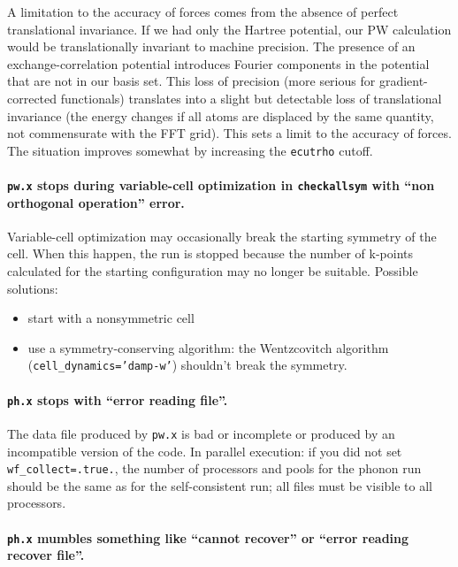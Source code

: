 \documentclass[12pt,a4paper]{article}
\begin{document}
A limitation to the accuracy of forces comes from the absence of
perfect translational invariance.  If we had only the Hartree
potential, our PW calculation would be translationally invariant to
machine precision.  The presence of an exchange-correlation potential
introduces Fourier components in the potential that are not in our
basis set.  This loss of precision (more serious for
gradient-corrected functionals) translates into a slight but
detectable loss of translational invariance (the energy changes if all
atoms are displaced by the same quantity, not commensurate with the
FFT grid).  This sets a limit to the accuracy of forces.  The
situation improves somewhat by increasing the \texttt{ecutrho} cutoff.

\paragraph{\texttt{pw.x} stops during variable-cell optimization
in \texttt{checkallsym} with ``non orthogonal operation'' error.}

Variable-cell optimization may occasionally break the starting
symmetry of the cell. When this happen, the run is stopped
because the number of k-points calculated for the starting
configuration may no longer be suitable. Possible solutions:
\begin{itemize}
\item start with a nonsymmetric cell
\item use a symmetry-conserving algorithm: the Wentzcovitch
algorithm \\
(\texttt{cell\_dynamics='damp-w'}) shouldn't break the symmetry.
\end{itemize}

\paragraph{\texttt{ph.x} stops with ``error reading file''.}

The data file produced by \texttt{pw.x} is bad or incomplete or
produced by an incompatible version of the code.
In parallel execution: if you did not set \texttt{wf\_collect=.true.},
the number of processors and pools for the phonon run should be the 
same as for the self-consistent run; all files must be visible to all 
processors.

\paragraph{\texttt{ph.x} mumbles something like ``cannot recover'' or
           ``error reading recover file''.}
\end{document}

